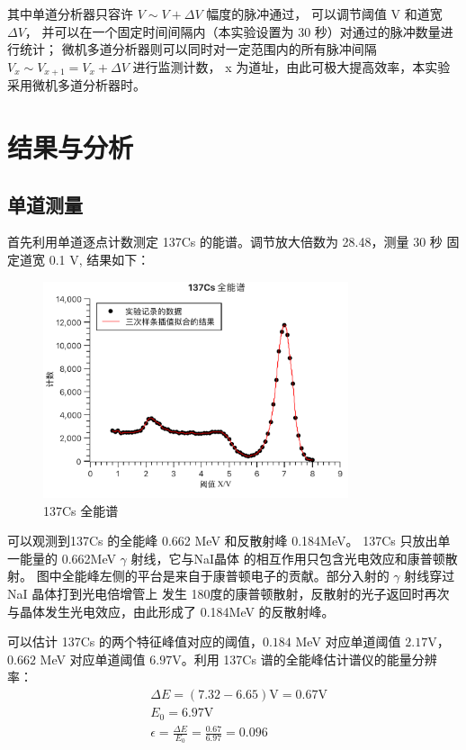\documentclass[revtex4-2]{mpltx}
\begin{document}
    其中单道分析器只容许 $V\sim V + \Delta V$ 幅度的脉冲通过，
    可以调节阈值 V 和道宽 $\Delta V$，
    并可以在一个固定时间间隔内（本实验设置为 30 秒）对通过的脉冲数量进行统计；
    微机多道分析器则可以同时对一定范围内的所有脉冲间隔 $V_x \sim V_{x+1}=V_x+\Delta V$ 进行监测计数，
    x 为道址，由此可极大提高效率，本实验采用微机多道分析器时。
\section{结果与分析}
    \subsection{单道测量}
    首先利用单道逐点计数测定 137Cs 的能谱。调节放大倍数为 28.48，测量 30 秒
    固定道宽 0.1 V, 结果如下：
    \begin{figure}[htbp]
        \centering
        \includegraphics[width=0.8\textwidth]{./pic1.pdf}
        \caption{137Cs 全能谱}
    \end{figure}

    可以观测到137Cs 的全能峰 0.662 MeV 和反散射峰 0.184MeV。
    137Cs 只放出单一能量的 0.662MeV $\gamma$ 射线，它与NaI晶体
    的相互作用只包含光电效应和康普顿散射。
    图中全能峰左侧的平台是来自于康普顿电子的贡献。部分入射的 $\gamma$ 射线穿过 NaI 晶体打到光电倍增管上
    发生 180度的康普顿散射，反散射的光子返回时再次与晶体发生光电效应，由此形成了 0.184MeV 的反散射峰。

    可以估计 137Cs 的两个特征峰值对应的阈值，$0.184$ MeV 对应单道阈值 $2.17$V， 
    $0.662$ MeV 对应单道阈值 $6.97$V。利用 137Cs 谱的全能峰估计谱仪的能量分辨率：
    \begin{align*}
        &\Delta E=(7.32-6.65)\mathrm{V} = 0.67\mathrm{V}\\
        &E_0 = 6.97 \mathrm{V}\\
        &\epsilon=\frac{\Delta E}{E_0} = \frac{0.67}{6.97} 
        = 0.096
    \end{align*}
\end{document}
